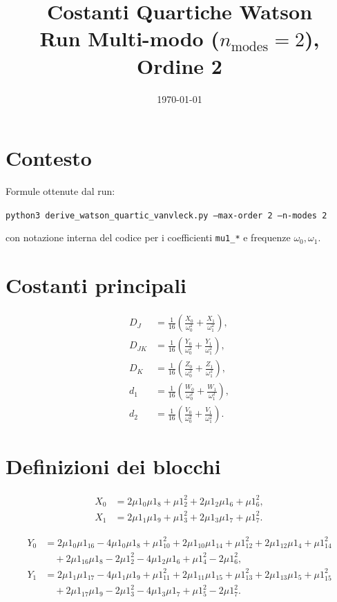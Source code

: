 \documentclass[11pt,a4paper]{article}
\title{Costanti Quartiche Watson\\Run Multi-modo ($n_{\mathrm{modes}}=2$), Ordine 2}
\author{}
\date{\today}
\begin{document}
\maketitle

\section*{Contesto}
Formule ottenute dal run:
\begin{center}
\texttt{python3 derive\_watson\_quartic\_vanvleck.py --max-order 2 --n-modes 2}
\end{center}
con notazione interna del codice per i coefficienti \texttt{mu1\_*} e frequenze \(\omega_0,\omega_1\).

\section*{Costanti principali}
\begin{align}
D_J &= \frac{1}{16}\left(\frac{X_0}{\omega_0^2}+\frac{X_1}{\omega_1^2}\right),\\[4pt]
D_{JK} &= \frac{1}{16}\left(\frac{Y_0}{\omega_0^2}+\frac{Y_1}{\omega_1^2}\right),\\[4pt]
D_K &= \frac{1}{16}\left(\frac{Z_0}{\omega_0^2}+\frac{Z_1}{\omega_1^2}\right),\\[4pt]
d_1 &= \frac{1}{16}\left(\frac{W_0}{\omega_0^2}+\frac{W_1}{\omega_1^2}\right),\\[4pt]
d_2 &= \frac{1}{16}\left(\frac{V_0}{\omega_0^2}+\frac{V_1}{\omega_1^2}\right).
\end{align}

\section*{Definizioni dei blocchi}
\begin{align}
X_0 &= 2\mu1_0\mu1_8+\mu1_2^2+2\mu1_2\mu1_6+\mu1_6^2,\\
X_1 &= 2\mu1_1\mu1_9+\mu1_3^2+2\mu1_3\mu1_7+\mu1_7^2.
\end{align}

\begin{align}
Y_0 &= 2\mu1_0\mu1_{16}-4\mu1_0\mu1_8+\mu1_{10}^2+2\mu1_{10}\mu1_{14}+\mu1_{12}^2+2\mu1_{12}\mu1_4+\mu1_{14}^2 \\
&\quad +2\mu1_{16}\mu1_8-2\mu1_2^2-4\mu1_2\mu1_6+\mu1_4^2-2\mu1_6^2,\\
Y_1 &= 2\mu1_1\mu1_{17}-4\mu1_1\mu1_9+\mu1_{11}^2+2\mu1_{11}\mu1_{15}+\mu1_{13}^2+2\mu1_{13}\mu1_5+\mu1_{15}^2 \\
&\quad +2\mu1_{17}\mu1_9-2\mu1_3^2-4\mu1_3\mu1_7+\mu1_5^2-2\mu1_7^2.
\end{align}
\end{document}
